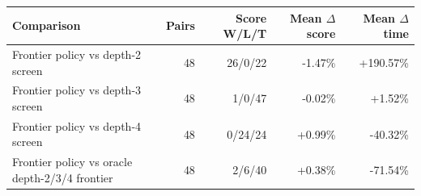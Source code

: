 \begin{tabular}{lrrrr}
\toprule
Comparison & Pairs & Score W/L/T & Mean $\Delta$ score & Mean $\Delta$ time \\
\midrule
Frontier policy vs depth-2 screen & 48 & 26/0/22 & -1.47\% & +190.57\% \\
Frontier policy vs depth-3 screen & 48 & 1/0/47 & -0.02\% & +1.52\% \\
Frontier policy vs depth-4 screen & 48 & 0/24/24 & +0.99\% & -40.32\% \\
Frontier policy vs oracle depth-2/3/4 frontier & 48 & 2/6/40 & +0.38\% & -71.54\% \\
\bottomrule
\end{tabular}
